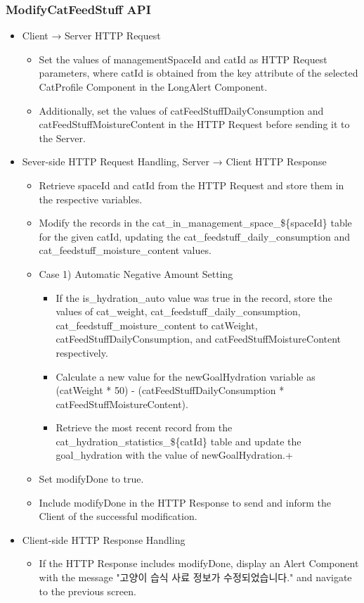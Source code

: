 \documentclass[conference]{IEEEtran}
\begin{document}
\subsubsection{ModifyCatFeedStuff API}
\begin{itemize}
    \item Client → Server HTTP Request
    \begin{itemize}
        \item Set the values of managementSpaceId and catId as HTTP Request parameters, where catId is obtained from the key attribute of the selected CatProfile Component in the LongAlert Component.
        \item Additionally, set the values of catFeedStuffDailyConsumption and catFeedStuffMoistureContent in the HTTP Request before sending it to the Server.
        \\
    \end{itemize}
    \item Sever-side HTTP Request Handling, Server → Client HTTP Response
    \begin{itemize}
        \item Retrieve spaceId and catId from the HTTP Request and store them in the respective variables.
        \item Modify the records in the cat\_in\_management\_space\_\$\{spaceId\} table for the given catId, updating the cat\_feedstuff\_daily\_consumption and cat\_feedstuff\_moisture\_content values.
        \item Case 1) Automatic Negative Amount Setting
        \begin{itemize}
            \item If the is\_hydration\_auto value was true in the record, store the values of cat\_weight, cat\_feedstuff\_daily\_consumption, cat\_feedstuff\_moisture\_content to catWeight, catFeedStuffDailyConsumption, and catFeedStuffMoistureContent respectively.
            \item Calculate a new value for the newGoalHydration variable as (catWeight * 50) - (catFeedStuffDailyConsumption * catFeedStuffMoistureContent).
            \item Retrieve the most recent record from the cat\_hydration\_statistics\_\$\{catId\} table and update the goal\_hydration with the value of newGoalHydration.+
        \end{itemize}
        \item Set modifyDone to true.
        \item Include modifyDone in the HTTP Response to send and inform the Client of the successful modification.
        \\
    \end{itemize}
    \item Client-side HTTP Response Handling
    \begin{itemize}
        \item If the HTTP Response includes modifyDone, display an Alert Component with the message "고양이 습식 사료 정보가 수정되었습니다." and navigate to the previous screen.
        \\
    \end{itemize}
\end{itemize}
\end{document}

